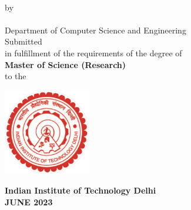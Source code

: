 
\begin{center}


\LARGE
\MakeUppercase{\textbf{\ThesisTitle{}}}\\
\vspace{0.9cm}

\large

{by}\\
\vspace{0.8cm}
{\Auth{}}\\
\vspace{.3cm}
{Department of Computer Science and Engineering}\\
\vspace{0.8cm}
{Submitted}\\
\vspace{0.25cm}
{in fulfillment of the requirements of the degree of \\{\bf  Master of Science (Research)}}\\
\vspace{0.8cm}
{to the }\\
\vspace{0.7cm}

\hspace{0cm}
\hbox{\includegraphics[width=9pc]{rest/iitd_logo.pdf}}

\vspace{0.3cm}
{\bf
\large{Indian Institute of Technology Delhi}\\
\large{JUNE 2023}\\
}


\end{center}


